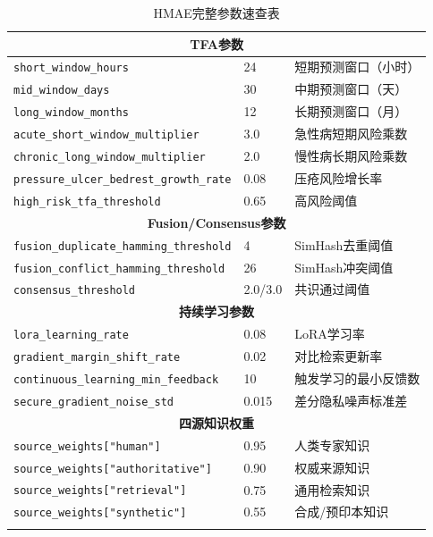 \documentclass[11pt,a4paper]{ctexart}
\begin{document}
\begin{longtable}{p{4cm}p{4cm}p{6cm}}
\multicolumn{3}{c}{\textbf{TFA参数}} \\
\midrule
\texttt{short\_window\_hours} & 24 & 短期预测窗口（小时） \\
\texttt{mid\_window\_days} & 30 & 中期预测窗口（天） \\
\texttt{long\_window\_months} & 12 & 长期预测窗口（月） \\
\texttt{acute\_short\_window\_multiplier} & 3.0 & 急性病短期风险乘数 \\
\texttt{chronic\_long\_window\_multiplier} & 2.0 & 慢性病长期风险乘数 \\
\texttt{pressure\_ulcer\_bedrest\_growth\_rate} & 0.08 & 压疮风险增长率 \\
\texttt{high\_risk\_tfa\_threshold} & 0.65 & 高风险阈值 \\
\midrule

\multicolumn{3}{c}{\textbf{Fusion/Consensus参数}} \\
\midrule
\texttt{fusion\_duplicate\_hamming\_threshold} & 4 & SimHash去重阈值 \\
\texttt{fusion\_conflict\_hamming\_threshold} & 26 & SimHash冲突阈值 \\
\texttt{consensus\_threshold} & 2.0/3.0 & 共识通过阈值 \\
\midrule

\multicolumn{3}{c}{\textbf{持续学习参数}} \\
\midrule
\texttt{lora\_learning\_rate} & 0.08 & LoRA学习率 \\
\texttt{gradient\_margin\_shift\_rate} & 0.02 & 对比检索更新率 \\
\texttt{continuous\_learning\_min\_feedback} & 10 & 触发学习的最小反馈数 \\
\texttt{secure\_gradient\_noise\_std} & 0.015 & 差分隐私噪声标准差 \\
\midrule

\multicolumn{3}{c}{\textbf{四源知识权重}} \\
\midrule
\texttt{source\_weights["human"]} & 0.95 & 人类专家知识 \\
\texttt{source\_weights["authoritative"]} & 0.90 & 权威来源知识 \\
\texttt{source\_weights["retrieval"]} & 0.75 & 通用检索知识 \\
\texttt{source\_weights["synthetic"]} & 0.55 & 合成/预印本知识 \\
\midrule

\caption{HMAE完整参数速查表}
\end{longtable}
\end{document}
